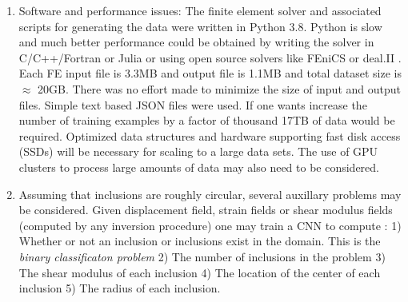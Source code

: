 \documentclass[12pt]{article}
\begin{document}
\begin{enumerate}
\item{Software and performance issues: The finite element solver and associated scripts for generating the data were written in Python 3.8. Python is slow and much better performance could be obtained by writing the solver in C/C++/Fortran or Julia or using open source solvers like FEniCS \cite{paper:fenics} or deal.II \cite{misc:deal.ii}. Each FE input file is 3.3MB and output file is 1.1MB and total dataset size is $\approx$  20GB. There was no effort made to minimize the size of input and output files. Simple text based JSON files were used. If one wants increase the number of training examples by a factor of thousand 17TB of data would be required. Optimized data structures and hardware supporting fast disk access (SSDs) will be necessary for scaling to a large data sets. The use of GPU clusters to process large amounts of data may also need to be considered. }
\item{Assuming that inclusions are roughly circular, several auxillary problems may be considered. Given displacement field, strain fields or shear modulus fields (computed by any inversion procedure) one may train a CNN to compute : 1) Whether or not an inclusion or inclusions exist  in the domain. This is the \textit{binary classificaton problem} 2) The number of inclusions in the problem 3) The shear modulus of each inclusion 4) The location of the center of each inclusion 5) The radius of each inclusion. }
\end{enumerate}
{}

\end{document}
